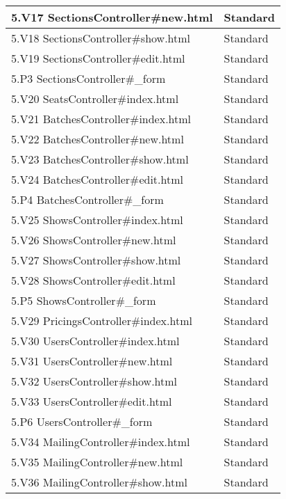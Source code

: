 \documentclass[a4paper, twoside, 11pt, titlepage]{article}
\begin{document}
\begin {table} [ht]
\begin{tabular} {  p{4cm} p{2cm} }
			\hline
			{ 5.V17 SectionsController\#new.html } & { Standard } \\
			\hline
			{ 5.V18 SectionsController\#show.html } & { Standard } \\
			\hline
			{ 5.V19 SectionsController\#edit.html } & { Standard } \\
			\hline
			{ 5.P3 SectionsController\#\_form } & { Standard } \\
			\hline
			{ 5.V20 SeatsController\#index.html } & { Standard } \\
			\hline
			{ 5.V21 BatchesController\#index.html } & { Standard } \\
			\hline
			{ 5.V22 BatchesController\#new.html } & { Standard } \\
			\hline
			{ 5.V23 BatchesController\#show.html } & { Standard } \\
			\hline
			{ 5.V24 BatchesController\#edit.html } & { Standard } \\
			\hline
			{ 5.P4 BatchesController\#\_form } & { Standard } \\
			\hline
			{ 5.V25 ShowsController\#index.html } & { Standard } \\
			\hline
			{ 5.V26 ShowsController\#new.html } & { Standard } \\
			\hline
			{ 5.V27 ShowsController\#show.html } & { Standard } \\
			\hline
			{ 5.V28 ShowsController\#edit.html } & { Standard } \\
			\hline
			{ 5.P5 ShowsController\#\_form } & { Standard } \\
			\hline
			{ 5.V29 PricingsController\#index.html } & { Standard } \\
			\hline
			{ 5.V30 UsersController\#index.html } & { Standard } \\
			\hline
			{ 5.V31 UsersController\#new.html } & { Standard } \\
			\hline
			{ 5.V32 UsersController\#show.html } & { Standard } \\
			\hline
			{ 5.V33 UsersController\#edit.html } & { Standard } \\
			\hline
			{ 5.P6 UsersController\#\_form } & { Standard } \\
			\hline
			{ 5.V34 MailingController\#index.html } & { Standard } \\
			\hline
			{ 5.V35 MailingController\#new.html } & { Standard } \\
			\hline
			{ 5.V36 MailingController\#show.html } & { Standard } \\

\end{tabular}
\end{table}
\end{document}
